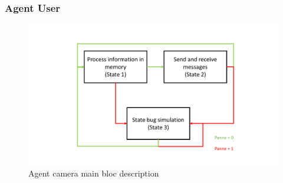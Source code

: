 \subsubsection{Agent User}

\begin{figure}[h!]
    \centering
    \includegraphics[page=1,clip,width = 12cm]{systeme_multi_agent/realisation/multi_agent_implemented_schematic.pdf}
    \caption{Agent camera main bloc description}
    \label{fig: agent_camera-bloc-overview}
\end{figure}
